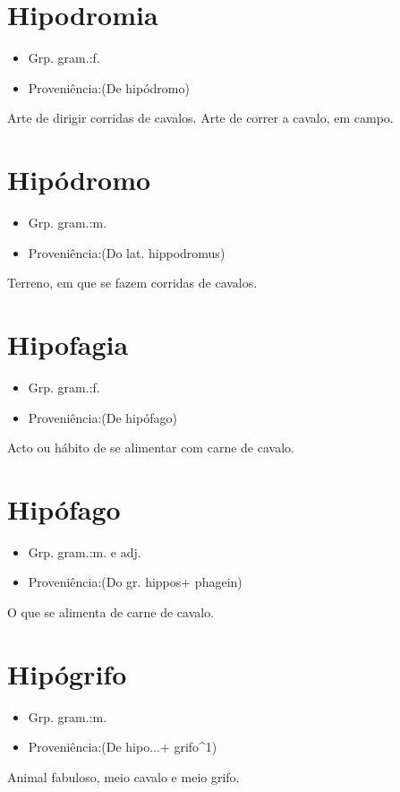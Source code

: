 \documentclass{article}
\begin{document}
\section{Hipodromia}
\begin{itemize}
\item {Grp. gram.:f.}
\end{itemize}
\begin{itemize}
\item {Proveniência:(De \textunderscore hipódromo\textunderscore )}
\end{itemize}
Arte de dirigir corridas de cavalos.
Arte de correr a cavalo, em campo.
\section{Hipódromo}
\begin{itemize}
\item {Grp. gram.:m.}
\end{itemize}
\begin{itemize}
\item {Proveniência:(Do lat. \textunderscore hippodromus\textunderscore )}
\end{itemize}
Terreno, em que se fazem corridas de cavalos.
\section{Hipofagia}
\begin{itemize}
\item {Grp. gram.:f.}
\end{itemize}
\begin{itemize}
\item {Proveniência:(De \textunderscore hipófago\textunderscore )}
\end{itemize}
Acto ou hábito de se alimentar com carne de cavalo.
\section{Hipófago}
\begin{itemize}
\item {Grp. gram.:m.  e  adj.}
\end{itemize}
\begin{itemize}
\item {Proveniência:(Do gr. \textunderscore hippos\textunderscore  + \textunderscore phagein\textunderscore )}
\end{itemize}
O que se alimenta de carne de cavalo.
\section{Hipógrifo}
\begin{itemize}
\item {Grp. gram.:m.}
\end{itemize}
\begin{itemize}
\item {Proveniência:(De \textunderscore hipo...\textunderscore  + \textunderscore grifo\textunderscore ^1)}
\end{itemize}
Animal fabuloso, meio cavalo e meio grifo.
\end{document}
